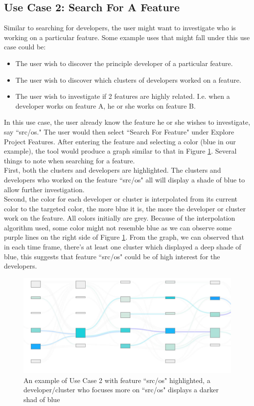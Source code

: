 \documentclass{article}
\begin{document}
\subsection{Use Case 2: Search For A Feature}
Similar to searching for developers, the user might want to investigate who is working on a particular feature. Some example uses that might fall under this use case could be:
\begin{itemize}
    \item The user wish to discover the principle developer of a particular feature.
    \item The user wish to discover which clusters of developers worked on a feature.
    \item The user wish to investigate if 2 features are highly related. I.e. when a developer works on feature A, he or she works on feature B.
\end{itemize}
In this use case, the user already know the feature he or she wishes to investigate, say ``src/os." The user would then select ``Search For Feature" under Explore Project Features. After entering the feature and selecting a color (blue in our example), the tool would produce a graph similar to that in Figure \ref{fig:usecase2}. Several things to note when searching for a feature.\\
First, both the clusters and developers are highlighted. The clusters and developers who worked on the feature ``src/os" all will display a shade of blue to allow further investigation.\\
Second, the color for each developer or cluster is interpolated from its current color to the targeted color, the more blue it is, the more the developer or cluster work on the feature. All colors initially are grey. Because of the interpolation algorithm used, some color might not resemble blue as we can observe some purple lines on the right side of Figure \ref{fig:usecase2}. From the graph, we can observed that in each time frame, there's at least one cluster which displayed a deep shade of blue, this suggests that feature ``src/os" could be of high interest for the developers.\\
\begin{figure}[h!]
\centering
\includegraphics[scale=0.6]{images/usecase2.JPG}
\caption{An example of Use Case 2 with feature ``src/os" highlighted, a developer/cluster who focuses more on ``src/os" displays a darker shad of blue}
\label{fig:usecase2}
\end{figure}
\end{document}
